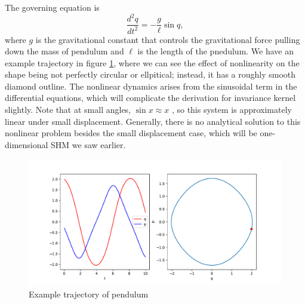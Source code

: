 \documentclass{statsmsc}
\begin{document}
The governing equation is 
$$
\frac{d^2q}{dt^2}=-\frac{g}{\ell}\sin q, 
$$
where $g$ is the gravitational constant that controls the gravitational force pulling down the mass of pendulum and $\ell$ is the length of the pnedulum.
We have an example trajectory in figure \ref{fig:pendulum_trajectory}, where we can see the effect of nonlinearity on the shape being not perfectly circular or ellpitical; instead, it has a roughly smooth diamond outline. 
The nonlinear dynamics arises from the sinusoidal term in the differential equations, which will complicate the derivation for invariance kernel slightly. 
Note that at small angles, $\sin x \approx x$ , so this system is approximately linear under small displacement. 
Generally, there is no analytical solution to this nonlinear problem besides the small displacement case, which will be one-dimensional SHM we saw earlier.

\begin{figure}[H] 
  \includegraphics[width=0.7\linewidth]{../codes/figures/pendulum_trajectory_1D.pdf}
  \centering
  \caption{Example trajectory of pendulum}
  \label{fig:pendulum_trajectory}
\end{figure}
\end{document}
